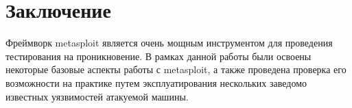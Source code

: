 \section{Заключение}

Фреймворк metasploit является очень мощным инструментом для проведения тестирования на проникновение. В рамках данной работы были освоены некоторые базовые аспекты работы с metasploit, а также проведена проверка его
возможности на практике путем эксплуатирования нескольких заведомо известных уязвимостей атакуемой машины.